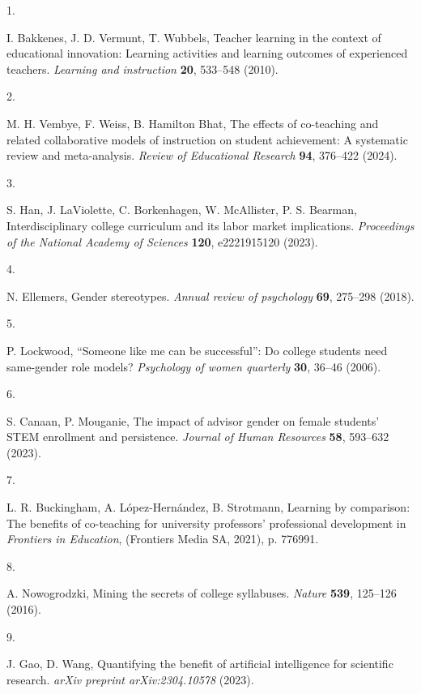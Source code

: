 \documentclass[
  11pt,
]{article}
\newlength{\cslhangindent}
\newlength{\csllabelwidth}
\newenvironment{CSLReferences}[2] %
 {\begin{list}{}{%
  \setlength{\itemindent}{0pt}
  \setlength{\leftmargin}{0pt}
  \setlength{\parsep}{0pt}
  \ifodd #1
   \setlength{\leftmargin}{\cslhangindent}
   \setlength{\itemindent}{-1\cslhangindent}
  \fi
  \setlength{\itemsep}{#2\baselineskip}}}
 {\end{list}}
\newcommand{\CSLLeftMargin}[1]{\parbox[t]{\csllabelwidth}{\strut#1\strut}}
\newcommand{\CSLRightInline}[1]{\parbox[t]{\linewidth - \csllabelwidth}{\strut#1\strut}}
\begin{document}
\label{refs}
\begin{CSLReferences}{0}{1}
\CSLLeftMargin{1. }%
\CSLRightInline{I. Bakkenes, J. D. Vermunt, T. Wubbels, Teacher learning in the context of educational innovation: Learning activities and learning outcomes of experienced teachers. \emph{Learning and instruction} \textbf{20}, 533--548 (2010).}

\CSLLeftMargin{2. }%
\CSLRightInline{M. H. Vembye, F. Weiss, B. Hamilton Bhat, The effects of co-teaching and related collaborative models of instruction on student achievement: A systematic review and meta-analysis. \emph{Review of Educational Research} \textbf{94}, 376--422 (2024).}

\CSLLeftMargin{3. }%
\CSLRightInline{S. Han, J. LaViolette, C. Borkenhagen, W. McAllister, P. S. Bearman, Interdisciplinary college curriculum and its labor market implications. \emph{Proceedings of the National Academy of Sciences} \textbf{120}, e2221915120 (2023).}

\CSLLeftMargin{4. }%
\CSLRightInline{N. Ellemers, Gender stereotypes. \emph{Annual review of psychology} \textbf{69}, 275--298 (2018).}

\CSLLeftMargin{5. }%
\CSLRightInline{P. Lockwood, {``Someone like me can be successful''}: Do college students need same-gender role models? \emph{Psychology of women quarterly} \textbf{30}, 36--46 (2006).}

\CSLLeftMargin{6. }%
\CSLRightInline{S. Canaan, P. Mouganie, The impact of advisor gender on female students' STEM enrollment and persistence. \emph{Journal of Human Resources} \textbf{58}, 593--632 (2023).}

\CSLLeftMargin{7. }%
\CSLRightInline{L. R. Buckingham, A. López-Hernández, B. Strotmann, Learning by comparison: The benefits of co-teaching for university professors' professional development in \emph{Frontiers in Education}, (Frontiers Media SA, 2021), p. 776991.}

\CSLLeftMargin{8. }%
\CSLRightInline{A. Nowogrodzki, Mining the secrets of college syllabuses. \emph{Nature} \textbf{539}, 125--126 (2016).}

\CSLLeftMargin{9. }%
\CSLRightInline{J. Gao, D. Wang, Quantifying the benefit of artificial intelligence for scientific research. \emph{arXiv preprint arXiv:2304.10578} (2023).}


\end{CSLReferences}
\end{document}
